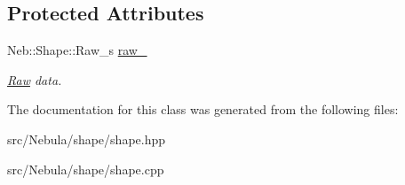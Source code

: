 \subsection*{\-Protected \-Attributes}
\begin{DoxyCompactItemize}
\item 
\hypertarget{classNeb_1_1Shape_1_1shape_ade9c0431ec637723b0b1e6109b833a9e}{\-Neb\-::\-Shape\-::\-Raw\-\_\-s \hyperlink{classNeb_1_1Shape_1_1shape_ade9c0431ec637723b0b1e6109b833a9e}{raw\-\_\-}}\label{classNeb_1_1Shape_1_1shape_ade9c0431ec637723b0b1e6109b833a9e}

\begin{DoxyCompactList}\small\item\em \hyperlink{classNeb_1_1Shape_1_1Raw}{\-Raw} data. \end{DoxyCompactList}\end{DoxyCompactItemize}


\-The documentation for this class was generated from the following files\-:\begin{DoxyCompactItemize}
\item 
src/\-Nebula/shape/shape.\-hpp\item 
src/\-Nebula/shape/shape.\-cpp\end{DoxyCompactItemize}
